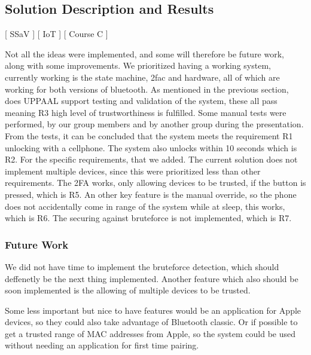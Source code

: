 \subsection{Solution Description and Results}\label{sec:SolutionDescriptionAndResults}
[ SSaV ] [ IoT ] [ Course C ] 
\newline
[ Casper ] [ Phu ] [ Simon ] 
\newline
\begin{comment}
The solution provides the functionality of connecting with bluetooth to the ESP, if the bluetooth connection is recognized as a trusted device, it will allow the user to enter. While it is also possible to open up the door with the potentiometer in case that the bluetooth is unable to connect, the idea is that malfunctions could happen and the user would still need access to their house and or belongings. If it were the case that non of the intended methods to gain entry is used, the bluetooth connection and potentiometer, an alarm will be set of as it would then be considered a forced entry.
\end{comment}

Not all the ideas were implemented, and some will therefore be future work, along with some improvements.
We prioritized having a working system, currently working is the state machine, 2fac and hardware, all of which are working for both versions of bluetooth.
As mentioned in the previous section, does UPPAAL support testing and validation of the system, these all pass meaning R3 high level of trustworthiness is fulfilled.
Some manual tests were performed, by our group members and by another group during the presentation.
From the tests, it can be concluded that the system meets the requirement R1 unlocking with a cellphone.
The system also unlocks within 10 seconds which is R2.
For the specific requirements, that we added.
The current solution does not implement multiple devices, since this were prioritized less than other requirements.
The 2FA works, only allowing devices to be trusted, if the button is pressed, which is R5.
An other key feature is the manual override, so the phone does not accidentally come in range of the system while at sleep, this works, which is R6.
The securing against bruteforce is not implemented, which is R7.

\subsubsection{Future Work}\label{sec:FutureWork}
We did not have time to implement the bruteforce detection, which should deffenetly be the next thing implemented. Another feature which also should be soon implemented is the allowing of multiple devices to be trusted.

Some less important but nice to have features would be an application for Apple devices, so they could also take advantage of Bluetooth classic.
Or if possible to get a trusted range of MAC addresses from Apple, so the system could be used without needing an application for first time pairing.
